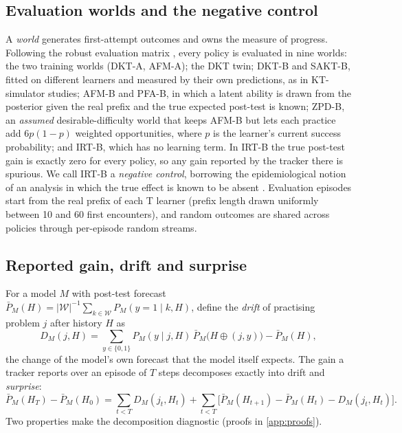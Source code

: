 \documentclass[a4paper,preprint,12pt,authoryear]{elsarticle}
\begin{document}
\subsection{Evaluation worlds and the negative control}\label{sec:worlds}

A \emph{world} generates first-attempt outcomes and owns the measure of progress. Following the robust evaluation matrix \citep{doroudi2017rem}, every policy is evaluated in nine worlds: the two training worlds (DKT-A, AFM-A); the DKT twin; DKT-B and SAKT-B, fitted on different learners and measured by their own predictions, as in KT-simulator studies; AFM-B and PFA-B, in which a latent ability is drawn from the posterior given the real prefix and the true expected post-test is known; ZPD-B, an \emph{assumed} desirable-difficulty world that keeps AFM-B but lets each practice add $6p(1-p)$ weighted opportunities, where $p$ is the learner's current success probability; and IRT-B, which has no learning term. In IRT-B the true post-test gain is exactly zero for every policy, so any gain reported by the tracker there is spurious. We call IRT-B a \emph{negative control}, borrowing the epidemiological notion of an analysis in which the true effect is known to be absent \citep{lipsitch2010negative,arnold2016negative}. Evaluation episodes start from the real prefix of each T learner (prefix length drawn uniformly between 10 and 60 first encounters), and random outcomes are shared across policies through per-episode random streams.

\subsection{Reported gain, drift and surprise}\label{sec:drift}

For a model $M$ with post-test forecast $\bar P_M(H)=|\mathcal W|^{-1}\sum_{k\in\mathcal W}P_M(y=1\mid k,H)$, define the \emph{drift} of practising problem $j$ after history $H$ as
\begin{equation}
D_M(j,H) = \sum_{y\in\{0,1\}} P_M(y\mid j,H)\,\bar P_M\bigl(H\oplus(j,y)\bigr) - \bar P_M(H),
\label{eq:drift}
\end{equation}
the change of the model's own forecast that the model itself expects. The gain a tracker reports over an episode of $T$ steps decomposes exactly into drift and \emph{surprise}:
\begin{equation}
\bar P_M(H_{T}) - \bar P_M(H_0) = \sum_{t<T} D_M(j_t,H_t) + \sum_{t<T} \bigl[\bar P_M(H_{t+1}) - \bar P_M(H_t) - D_M(j_t,H_t)\bigr].
\label{eq:decomposition}
\end{equation}
Two properties make the decomposition diagnostic (proofs in \ref{app:proofs}).
\end{document}

